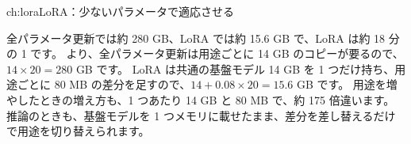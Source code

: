 \begin{answers}{ch:lora}{LoRA：少ないパラメータで適応させる}
\item 全パラメータ更新では約 280 GB、LoRA では約 15.6 GB で、LoRA は約 18 分の 1 です。
より、全パラメータ更新は用途ごとに 14 GB のコピーが要るので、$14\times20=280$ GB です。
LoRA は共通の基盤モデル 14 GB を 1 つだけ持ち、用途ごとに 80 MB の差分を足すので、$14+0.08\times20=15.6$ GB です。
用途を増やしたときの増え方も、1 つあたり 14 GB と 80 MB で、約 175 倍違います。
推論のときも、基盤モデルを 1 つメモリに載せたまま、差分を差し替えるだけで用途を切り替えられます。
\end{answers}

